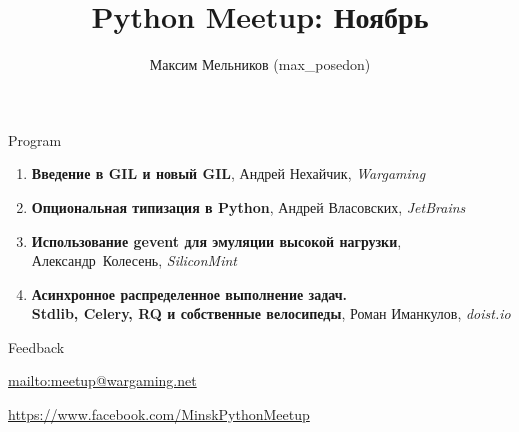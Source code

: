\documentclass[aspectratio=169]{beamer}
\begin{document}
\title{Python Meetup: Ноябрь}
\author{Максим Мельников (max\_posedon)}
\date{}

\begin{frame}{\inserttitle}
    \begin{block}{Program}
    \begin{enumerate}
        \item \textbf{Введение в GIL и новый GIL}, Андрей Нехайчик, \textit{Wargaming}
        \item \textbf{Опциональная типизация в Python}, Андрей Власовских, \textit{JetBrains}
        \item \textbf{Использование gevent для эмуляции высокой нагрузки}, Александр~Колесень, \textit{SiliconMint}
        \item \textbf{Асинхронное распределенное выполнение задач.\\Stdlib, Celery, RQ и собственные велосипеды}, Роман Иманкулов, \textit{doist.io}
    \end{enumerate}
    \end{block}

    \begin{block}{Feedback}
    \par \url{mailto:meetup@wargaming.net}
    \par \url{https://www.facebook.com/MinskPythonMeetup}
    \end{block}
\end{frame}
\end{document}

